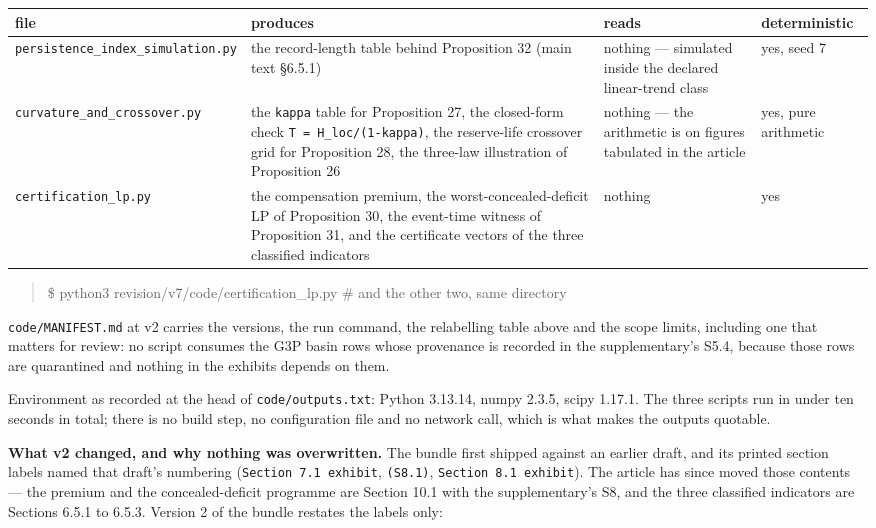 \documentclass[11pt]{article}
\begin{document}
\begin{longtable}{@{}l|p{50mm}|p{50mm}|l@{}}
\toprule
file & produces & reads & deterministic \\
\midrule
\texttt{persistence\_index\_simulation.py} & the record-length table behind Proposition 32 (main text \S6.5.1) & nothing --- simulated inside the declared linear-trend class & yes, seed 7 \\
\texttt{curvature\_and\_crossover.py} & the \texttt{kappa} table for Proposition 27, the closed-form check \texttt{T = H\_loc/(1-kappa)}, the reserve-life crossover grid for Proposition 28, the three-law illustration of Proposition 26 & nothing --- the arithmetic is on figures tabulated in the article & yes, pure arithmetic \\
\texttt{certification\_lp.py} & the compensation premium, the worst-concealed-deficit LP of Proposition 30, the event-time witness of Proposition 31, and the certificate vectors of the three classified indicators & nothing & yes \\
\bottomrule
\end{longtable}

\begin{quote}\ttfamily\footnotesize\raggedright\setlength{\parskip}{0pt}
\$ python3 revision/v7/code/certification\_lp.py            \# and the other two, same directory
\end{quote}

\texttt{code/MANIFEST.md} at v2 carries the versions, the run command, the relabelling table above and the scope limits, including one that matters for review: no script consumes the G3P basin rows whose provenance is recorded in the supplementary's S5.4, because those rows are quarantined and nothing in the exhibits depends on them.

Environment as recorded at the head of \texttt{code/outputs.txt}: Python 3.13.14, numpy 2.3.5, scipy 1.17.1. The three scripts run in under ten seconds in total; there is no build step, no configuration file and no network call, which is what makes the outputs quotable.

\textbf{What v2 changed, and why nothing was overwritten.} The bundle first shipped against an earlier draft, and its printed section labels named that draft's numbering (\texttt{Section 7.1 exhibit}, \texttt{(S8.1)}, \texttt{Section 8.1 exhibit}). The article has since moved those contents --- the premium and the concealed-deficit programme are Section 10.1 with the supplementary's S8, and the three classified indicators are Sections 6.5.1 to 6.5.3. Version 2 of the bundle restates the labels only:
\end{document}

